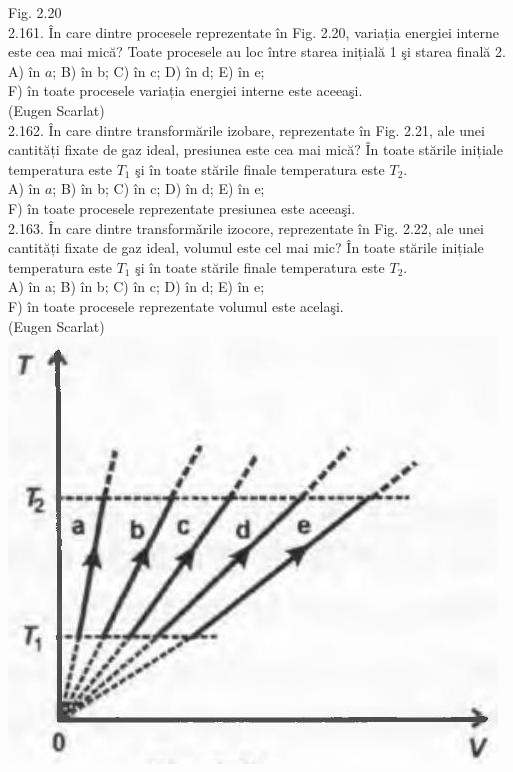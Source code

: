 \documentclass[10pt]{article}
\begin{document}
Fig. 2.20\\
2.161. În care dintre procesele reprezentate în Fig. 2.20, variația energiei interne este cea mai mică? Toate procesele au loc între starea inițială 1 şi starea finală 2.\\
A) în $a$; B) în b; C) în c; D) în d; E) în e;\\
F) în toate procesele variația energiei interne este aceeaşi.\\
(Eugen Scarlat)\\
2.162. În care dintre transformările izobare, reprezentate în Fig. 2.21, ale unei cantități fixate de gaz ideal, presiunea este cea mai mică? În toate stările inițiale temperatura este $T_{1}$ şi în toate stările finale temperatura este $T_{2}$.\\
A) în $a$; B) în b; C) în c; D) în d; E) în e;\\
F) în toate procesele reprezentate presiunea este aceeaşi.\\
2.163. În care dintre transformǎrile izocore, reprezentate în Fig. 2.22, ale unei cantități fixate de gaz ideal, volumul este cel mai mic? În toate stările inițiale temperatura este $T_{1}$ şi în toate stările finale temperatura este $T_{2}$.\\
A) în a; B) în b; C) în c; D) în d; E) în e;\\
F) în toate procesele reprezentate volumul este acelaşi.\\
(Eugen Scarlat)\\
\includegraphics[max width=\textwidth, center]{2025_07_01_5b3ff9fa0d508c8e9f17g-110(3)}
\end{document}
